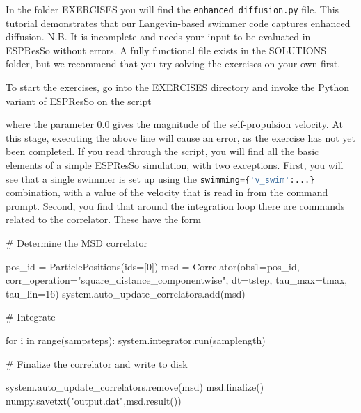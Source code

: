 \documentclass[aip,jcp,reprint,a4paper,onecolumn,amsmath]{revtex4-1}
\newcommand\code{\lstinline}
\newcommand{\es}{\mbox{\textsf{ESPResSo}}\xspace}
\newcommand\codees{\lstinline[language=python]}
\begin{document}
In the folder EXERCISES you will find the \code{enhanced_diffusion.py} file. This tutorial demonstrates that our Langevin-based swimmer code captures enhanced diffusion. N.B. It is incomplete and needs your input to be evaluated in \es{} without errors. A fully functional file exists in the SOLUTIONS folder, but we recommend that you try solving the exercises on your own first.

To start the exercises, go into the EXERCISES directory and invoke the Python variant of \es{} on the script
where the parameter 0.0 gives the magnitude of the self-propulsion velocity. At this stage, executing the above line will cause an error, as the exercise has not yet been completed. If you read through the script, you will find all the basic elements of a simple \es{} simulation, with two exceptions. First, you will see that a single swimmer is set up using the \codees|swimming={'v_swim':...}| combination, with a value of the velocity that is read in from the command prompt. Second, you find that around the integration loop there are commands related to the correlator. These have the form
\begin{espresso}
# Determine the MSD correlator

pos_id = ParticlePositions(ids=[0])
msd = Correlator(obs1=pos_id,
                   corr_operation="square_distance_componentwise",
                   dt=tstep,
                   tau_max=tmax,
                   tau_lin=16)
system.auto_update_correlators.add(msd)

# Integrate

for i in range(sampsteps):
    system.integrator.run(samplength)

# Finalize the correlator and write to disk

system.auto_update_correlators.remove(msd)
msd.finalize()
numpy.savetxt("output.dat",msd.result())
\end{espresso}
\end{document}

